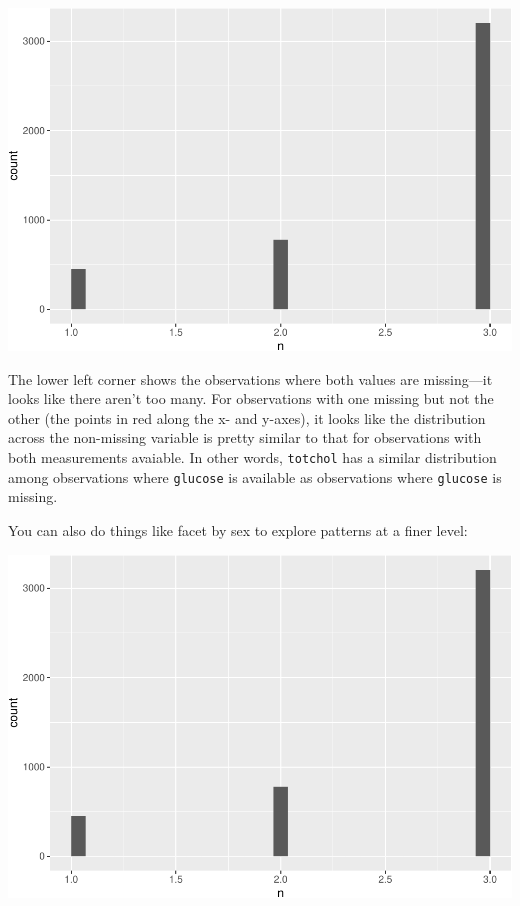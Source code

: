 \documentclass[
]{book}
\newenvironment{Shaded}{\begin{snugshade}}{\end{snugshade}}
\newcommand{\DataTypeTok}[1]{\textcolor[rgb]{0.13,0.29,0.53}{#1}}
\newcommand{\KeywordTok}[1]{\textcolor[rgb]{0.13,0.29,0.53}{\textbf{#1}}}
\newcommand{\NormalTok}[1]{#1}
\newcommand{\OperatorTok}[1]{\textcolor[rgb]{0.81,0.36,0.00}{\textbf{#1}}}
\newcommand{\StringTok}[1]{\textcolor[rgb]{0.31,0.60,0.02}{#1}}
\begin{document}
\includegraphics{adv_epi_analysis_files/figure-latex/unnamed-chunk-69-1.pdf}

The lower left corner shows the observations where both values are missing---it
looks like there aren't too many. For observations with one missing but not the
other (the points in red along the x- and y-axes), it looks like the distribution
across the non-missing variable is pretty similar to that for observations
with both measurements avaiable. In other words, \texttt{totchol} has a similar
distribution among observations where \texttt{glucose} is available as observations
where \texttt{glucose} is missing.

You can also do things like facet by sex to explore patterns at a finer level:

\begin{Shaded}
\end{Shaded}

\includegraphics{adv_epi_analysis_files/figure-latex/unnamed-chunk-70-1.pdf}
\end{document}
